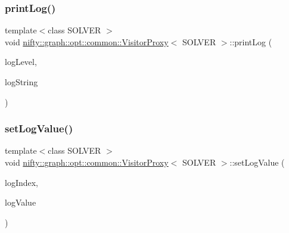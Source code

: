 \subsubsection{\texorpdfstring{print\+Log()}{printLog()}}
{\footnotesize\ttfamily template$<$class S\+O\+L\+V\+ER $>$ \\
void \hyperlink{classnifty_1_1graph_1_1opt_1_1common_1_1VisitorProxy}{nifty\+::graph\+::opt\+::common\+::\+Visitor\+Proxy}$<$ S\+O\+L\+V\+ER $>$\+::print\+Log (\begin{DoxyParamCaption}\item[{const \hyperlink{namespacenifty_1_1logging_a3385625f9a0dbb17f70c47d3fca2f64d}{nifty\+::logging\+::\+Log\+Level}}]{log\+Level,  }\item[{const std\+::string \&}]{log\+String }\end{DoxyParamCaption})\hspace{0.3cm}{\ttfamily [inline]}}

\mbox{\label{classnifty_1_1graph_1_1opt_1_1common_1_1VisitorProxy_a602a7f47e02cacce5494f997d50ec995}} 
\subsubsection{\texorpdfstring{set\+Log\+Value()}{setLogValue()}}
{\footnotesize\ttfamily template$<$class S\+O\+L\+V\+ER $>$ \\
void \hyperlink{classnifty_1_1graph_1_1opt_1_1common_1_1VisitorProxy}{nifty\+::graph\+::opt\+::common\+::\+Visitor\+Proxy}$<$ S\+O\+L\+V\+ER $>$\+::set\+Log\+Value (\begin{DoxyParamCaption}\item[{const std\+::size\+\_\+t}]{log\+Index,  }\item[{const double}]{log\+Value }\end{DoxyParamCaption})\hspace{0.3cm}{\ttfamily [inline]}}

\mbox{\label{classnifty_1_1graph_1_1opt_1_1common_1_1VisitorProxy_a78b19aa3247ad044f62f81fbd10293b7}} 
